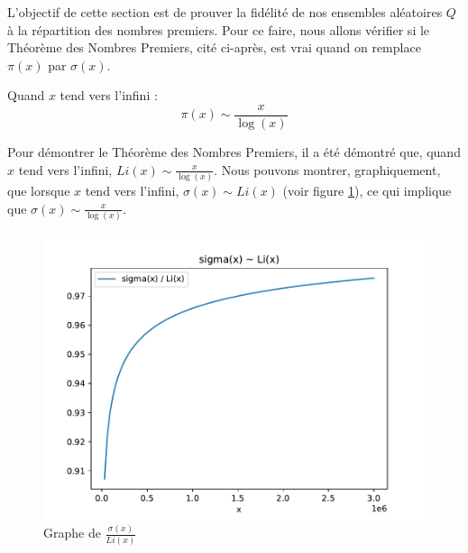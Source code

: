 \documentclass [a4paper, 11pt, twoside] {article}
\begin{document}
L'objectif de cette section est de prouver la fidélité de nos ensembles aléatoires $Q$ à la répartition des nombres premiers.
Pour ce faire, nous allons vérifier si le Théorème des Nombres Premiers, cité ci-après, est vrai quand on remplace $\pi(x)$ par $\sigma(x)$. 

\begin{Thm}
\label{TNP}
	Quand $x$ tend vers l'infini : 
	\[ \pi(x) \sim \frac{x}{\log(x)}  \]
\end{Thm}

Pour démontrer le Théorème des Nombres Premiers, il a été démontré que, quand $x$ tend vers l'infini, $ Li(x) \sim \frac{x}{\log(x)} $. Nous pouvons montrer, graphiquement, que lorsque $x$ tend vers l'infini, $ \sigma(x) \sim Li(x) $ (voir figure \ref{im:image3}), ce qui implique que $ \sigma(x) \sim \frac{x}{\log(x)} $.
\begin{figure}[htbp]
	\centerline{\includegraphics[width = \textwidth]{test2.pdf}}
\caption{Graphe de $\frac{\sigma(x)}{Li(x)}$ }
	\label{im:image3}
\end{figure}
\end{document}
